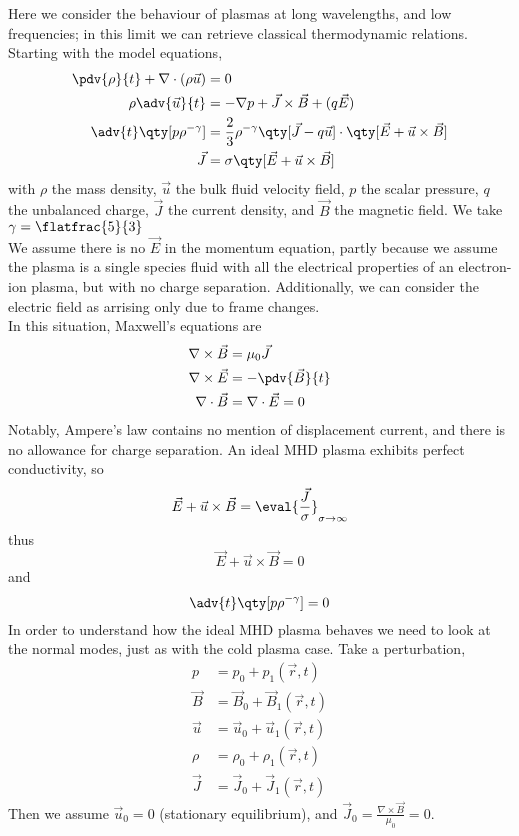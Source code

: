 \documentclass{book}         		                %
\begin{document}
Here we consider the behaviour of plasmas at long wavelengths, and low
frequencies; in this limit we can retrieve classical thermodynamic
relations. 
Starting with the model equations,
\begin{subequations}
  \begin{align}
    \pdv{\rho}{t} + \nabla \cdot (\rho \vec{u}) &= 0 \\
\rho \adv{\vec{u}}{t} &= - \nabla p + \vec{J} \times \vec{B} + (q \vec{E}) \\
\adv{t} \qty[ p \rho^{-\gamma} ] &= \frac{2}{3} \rho^{-\gamma} \qty[ \vec{J} - q \vec{u}] \cdot \qty[ \vec{E} + \vec{u} \times \vec{B}] \\
\vec{J} &= \sigma \qty[ \vec{E} + \vec{u} \times \vec{B}]
  \end{align}
\end{subequations}
with $\rho$ the mass density, $\vec{u}$ the bulk fluid velocity field,
$p$ the scalar pressure, $q$ the unbalanced charge, $\vec{J}$ the
current density, and $\vec{B}$
the magnetic field. We take $\gamma = \flatfrac{5}{3}$\\
We assume there is no $\vec{E}$ in the momentum equation, partly
because we assume the plasma is a single species fluid with all the
electrical properties of an electron-ion plasma, but with no charge
separation. Additionally, we can consider the electric field as
arrising only due to frame changes. \\
In this situation, Maxwell's equations are
\begin{subequations}
  \begin{align}
    \nabla \times \vec{B} &= \mu_0 \vec{J} \\
\nabla \times \vec{E} &= - \pdv{\vec{B}}{t} \\
\nabla \cdot \vec{B} &= \nabla \cdot \vec{E} =0
  \end{align}
\end{subequations}
Notably, Ampere's law contains no mention of displacement current, and
there is no allowance for charge separation.
An ideal MHD plasma exhibits perfect conductivity, so
\[ \vec{E} + \vec{u} \times \vec{B} = \eval{\frac{\vec{J}}{\sigma}}_{\sigma \to \infty} \] 
thus
\[ \vec{E} + \vec{u} \times \vec{B} =0\]
and
\[ \adv{t}\qty[p \rho^{-\gamma}] = 0\] In order to understand how the
ideal MHD plasma behaves we need to look at the normal modes, just as
with the cold plasma case.
Take a perturbation,
\begin{subequations}
  \begin{align}
    p   & = p_0 + p_1 (\vec{r}, t)             \\
\vec{B} & = \vec{B}_0 + \vec{B}_1 (\vec{r}, t) \\
\vec{u} & = \vec{u}_0 + \vec{u}_1 (\vec{r}, t) \\
\rho    & = \rho_0 + \rho_1 (\vec{r}, t)       \\
\vec{J} & = \vec{J}_0 + \vec{J}_1 (\vec{r}, t)
  \end{align}
\end{subequations}
Then we assume $\vec{u}_0 = 0$ (stationary equilibrium), and
$\vec{J}_0 = \frac{\nabla \times \vec{B}}{\mu_0} = 0$.
\end{document}
